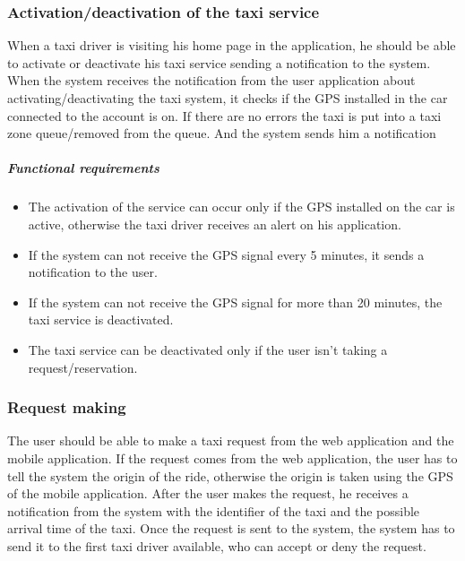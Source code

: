 \subsubsection{Activation/deactivation of the taxi service}
When a taxi driver is visiting his home page in the application, he should be able to activate or deactivate his taxi service sending a notification to the system.
When the system receives the notification from the user application about activating/deactivating the taxi system, it checks if the GPS installed in the car connected to the account is on. If there are no errors the taxi is put into a taxi zone queue/removed from the queue. And the system sends him a notification

	\subparagraph{Functional requirements}
	\noindent
		\begin{itemize}
			\item The activation of the service can occur only if the GPS installed on the car is active, otherwise the taxi driver receives an alert on his application.
			\item If the system can not receive the GPS signal every 5 minutes, it sends a notification to the user.
			\item If the system can not receive the GPS signal for more than 20 minutes, the taxi service is deactivated.
			\item The taxi service can be deactivated only if the user isn't taking a request/reservation.
		\end{itemize} 


\subsubsection{Request making}
The user should be able to make a taxi request from the web application and the mobile application. If the request comes from the web application, the user has to tell the system the origin of the ride, otherwise the origin is taken using the GPS of the mobile application.
After the user makes the request, he receives a notification from the system with the identifier of the taxi and the possible arrival time of the taxi.
Once the request is sent to the system, the system has to send it to the first taxi driver available, who can accept or deny the request.

